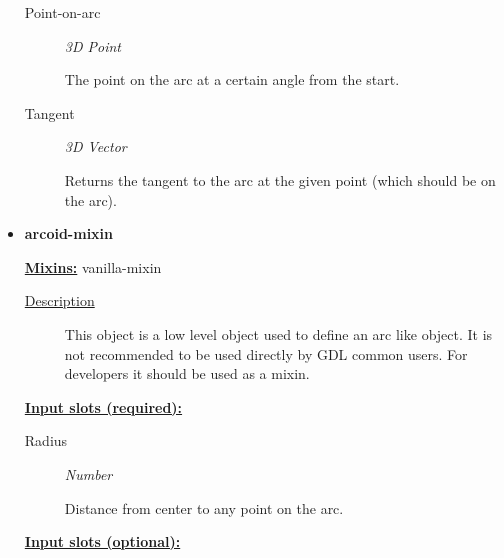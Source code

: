 \documentclass [11pt]{book}
\begin{document}
\begin{itemize}
\begin{description}
\item [Point-on-arc]
\emph{3D Point}

 The point on the arc at a certain angle from the start.




\item [Tangent]
\emph{3D Vector}

 Returns the tangent to the arc at the given point (which should be on the arc).




\end{description}







\item {}
\label{prim:arcoid-mixin}
\textbf{arcoid-mixin}


\textbf{
\underline{Mixins:}} vanilla-mixin





\begin{description}

\item [
\underline{Description}]


This object is a low level object used to define 
an arc like object. It is not recommended to be used directly by GDL common users. 
For developers it should be used as a mixin.



\end{description}








\textbf{
\underline{Input slots (required):}}

\begin{description}

\item [Radius]
\emph{Number}

 Distance from center to any point on the arc.




\end{description}






\textbf{
\underline{Input slots (optional):}}

\begin{description}


\end{description}
\end{itemize}
\end{document}

